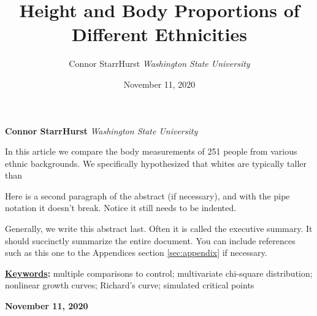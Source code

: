 \documentclass[]{article}
\title{\textbf{\textcolor{WSU.crimson}{Height and Body Proportions of Different Ethnicities}}  }
\author{\Large Connor StarrHurst\vspace{0.05in} \newline\normalsize\emph{Washington State University}  }
\date{November 11, 2020}
\newcommand*{\authorfont}{\fontfamily{phv}\selectfont}
\renewenvironment{abstract}
 {{%
    \setlength{\leftmargin}{0mm}
    \setlength{\rightmargin}{\leftmargin}%
  }%
  \relax}
 {\endlist}
\begin{document}
	
%

{%
\setlength{\parindent}{0pt}
\thispagestyle{plain}
{\fontsize{18}{20}\selectfont\raggedright 
\maketitle  %

}

{
   \vskip 13.5pt\relax \normalsize\fontsize{11}{12} 
   
\textbf{\authorfont Connor StarrHurst} \hskip 15pt \emph{\small Washington State University}   

}

}








\begin{abstract}

    \hbox{\vrule height .2pt width 39.14pc}

    \vskip 8.5pt %

\noindent In this article we compare the body measurements of 251 people from
various ethnic backgrounds. We specifically hypothesized that whites are
typically taller than \vspace{0.25in}

\noindent Here is a second paragraph of the abstract (if necessary), and
with the pipe notation it doesn't break. Notice it still needs to be
indented. \vspace{0.25in}

\noindent Generally, we write this abstract last. Often it is called the
executive summary. It should succinctly summarize the entire document.
You can include references such as this one to the Appendices section
\ref{sec:appendix} if necessary.


\vskip 8.5pt \noindent \textbf{\underline{Keywords}:} multiple comparisons to control; multivariate chi-square distribution;
nonlinear growth curves; Richard's curve; simulated critical points \par

    




    
    \hbox{\vrule height .2pt width 39.14pc}
    \vskip 5pt 
    \hfill \textbf{\textcolor{WSU.gray}{ November 11, 2020 } }
    \vskip 5pt 
    
\end{abstract}
\end{document}
